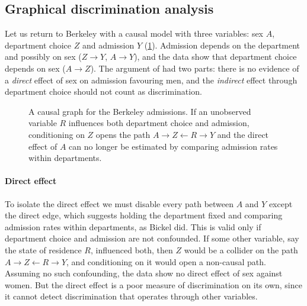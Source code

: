 \subsection{Graphical discrimination analysis}

Let us return to Berkeley with a causal model with three variables: sex $A$, department choice
$Z$ and admission $Y$ (\cref{fig:berkeley}). Admission depends on the department and possibly on
sex ($Z\rightarrow Y$, $A\rightarrow Y$), and the data show that department choice depends on sex
($A\rightarrow Z$). The argument of \citet{bickel1975sex} had two parts: there is no evidence of a
\emph{direct} effect of sex on admission favouring men, and the \emph{indirect} effect through
department choice should not count as discrimination.

\begin{figure}[htbp]
\centering
{}
\caption{A causal graph for the Berkeley admissions. If an unobserved variable $R$ influences both
department choice and admission, conditioning on $Z$ opens the path $A\rightarrow Z\leftarrow
R\rightarrow Y$ and the direct effect of $A$ can no longer be estimated by comparing admission
rates within departments.}
\label{fig:berkeley}
\end{figure}

\paragraph{Direct effect} To isolate the direct effect we must disable every path between $A$ and
$Y$ except the direct edge, which suggests holding the department fixed and comparing admission
rates within departments, as Bickel did. This is valid only if department choice and admission are
not confounded. If some other variable, say the state of residence $R$, influenced both, then $Z$
would be a collider on the path $A\rightarrow Z\leftarrow R\rightarrow Y$, and conditioning on it
would open a non-causal path. Assuming no such confounding, the data show no direct effect of sex
against women. But the direct effect is a poor measure of discrimination on its own, since it
cannot detect discrimination that operates through other variables.

